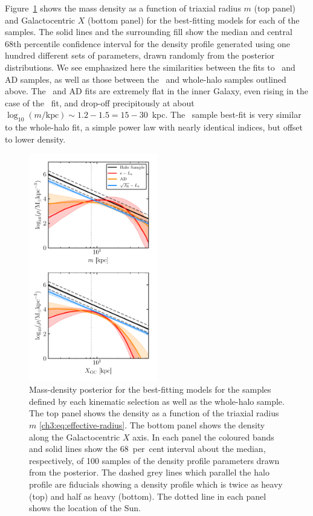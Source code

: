 Figure~\ref{ch3:fig:pdensity} shows the mass density as a function of triaxial radius $m$ (top panel) and Galactocentric $X$ (bottom panel) for the best-fitting models for each of the samples. The solid lines and the surrounding fill show the median and central 68th percentile confidence interval for the density profile generated using one hundred different sets of parameters, drawn randomly from the posterior distributions. We see emphasized here the similarities between the fits to \eLz\ and AD samples, as well as those between the \JRLz\ and whole-halo samples outlined above. The \eLz\ and AD fits are extremely flat in the inner Galaxy, even rising in the case of the \eLz\ fit, and drop-off precipitously at about $\log_{10}(m/\mathrm{kpc}) \sim 1.2-1.5 = 15-30$~kpc. The \JRLz\ sample best-fit is very similar to the whole-halo fit, a simple power law with nearly identical indices, but offset to lower density.

\begin{figure}
    \centering
    \includegraphics[width=0.5\textwidth]{figure/ch3/pdensity_gcx.pdf}
    \caption{Mass-density posterior for the best-fitting models for the \gse samples defined by each kinematic selection as well as the whole-halo sample. The top panel shows the density as a function of the triaxial radius $m$ \eqref{ch3:eq:effective-radius}. The bottom panel shows the density along the Galactocentric $X$ axis. In each panel the coloured bands and solid lines show the 68~per~cent interval about the median, respectively, of 100 samples of the density profile parameters drawn from the posterior. The dashed grey lines which parallel the halo profile are fiducials showing a density profile which is twice as heavy (top) and half as heavy (bottom). The dotted line in each panel shows the location of the Sun.}
    \label{ch3:fig:pdensity}
\end{figure}

